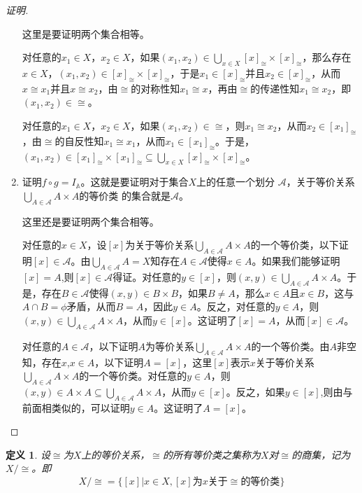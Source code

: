 \documentclass{book}[oneside]
\newtheorem{Def}{定义}[chapter]
\begin{document}
\begin{CJK*}{UTF8}{gbsn}
\begin{proof}[证明]
\begin{enumerate}
      这里是要证明两个集合相等。

      对任意的$x_1\in X$，$x_2\in X$，如果$(x_1,x_2)\in \bigcup_{x\in X}[x]_{\cong}\times [x]_{\cong}$，那么存在$x\in X$，$(x_1,x_2)\in [x]_{\cong}\times [x]_{\cong}$，于是$x_1\in [x]_{\cong}$并且$x_2\in [x]_{\cong}$，从而$x\cong x_1$并且$x\cong x_2$，由$\cong$的对称性知$x_1\cong x$，再由$\cong$的传递性知$x_1\cong x_2$，即$(x_1,x_2)\in \cong$。

      对任意的$x_1\in X$，$x_2\in X$，如果$(x_1,x_2)\in \cong$，则$x_1\cong x_2$，从而$x_2\in [x_1]_{\cong}$，由$\cong$的自反性知$x_1\cong x_1$，从而$x_1\in [x_1]_{\cong}$。于是，$(x_1,x_2)\in [x_1]_{\cong}\times [x_1]_{\cong}\subseteq \bigcup_{x\in X}[x]_{\cong}\times [x]_{\cong}$。
    \item 证明$f\circ g = I_{\mathbb{A}}$。这就是要证明对于集合$X$上的任意一个划分
      $\mathscr{A}$，关于等价关系$\bigcup_{A \in \mathscr{A}}A\times A$的等价类
      的集合就是$\mathscr{A}$。

      这里还是要证明两个集合相等。

      对任意的$x\in X$，设$[x]$为关于等价关系$\bigcup_{A \in \mathscr{A}}A\times A$的一个等价类，以下证明$[x]\in \mathscr{A}$。由$\bigcup_{A\in \mathscr{A}}A=X$知存在$A\in \mathscr{A}$使得$x\in A$。如果我们能够证明$[x]=A$,则$[x]\in \mathscr{A}$得证。对任意的$y\in [x]$，则$(x,y)\in \bigcup_{A \in \mathscr{A}}A\times A$。于是，存在$B\in \mathscr{A}$使得$(x,y)\in B\times B$，如果$B\neq A$，那么$x\in A$且$x\in B$，这与$A\cap B=\phi$矛盾，从而$B=A$，因此$y\in A$。反之，对任意的$y\in A$，则$(x,y)\in \bigcup_{A \in \mathscr{A}}A\times A$，从而$y\in [x]$。这证明了$[x]=A$，从而$[x]\in \mathscr{A}$。

      对任意的$A\in \mathscr{A}$，以下证明$A$为等价关系$\bigcup_{A \in \mathscr{A}}A\times A$的一个等价类。由$A$非空知，存在$x$,$x\in A$，以下证明$A=[x]$，这里$[x]$表示$x$关于等价关系$\bigcup_{A \in \mathscr{A}}A\times A$的一个等价类。对任意的$y\in A$，则$(x,y)\in A\times A \subseteq \bigcup_{A \in \mathscr{A}}A\times A$，从而$y\in [x]$。反之，如果$y\in [x]$,则由与前面相类似的，可以证明$y\in A$。这证明了$A=[x]$。
    \end{enumerate}
  \end{proof}
  \begin{Def}
    设$\cong$为$X$上的等价关系，$\cong$的所有等价类之集称为$X$对$\cong$的商集，记为$X/\cong$。即
    \[X/\cong = \{[x]|x\in X,[x]\text{为}x\text{关于}\cong \text{的等价类}\}\]
  \end{Def}


\end{CJK*}
\end{document}
